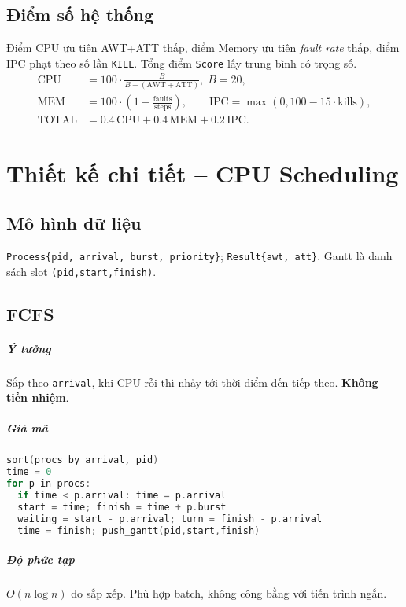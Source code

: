 \documentclass[12pt,a4paper]{report}
\begin{document}
\section{Điểm số hệ thống}
Điểm CPU ưu tiên AWT+ATT thấp, điểm Memory ưu tiên \textit{fault rate} thấp, điểm IPC phạt theo số lần \verb|KILL|. Tổng điểm \texttt{Score} lấy trung bình có trọng số.
\begin{align*}
 \text{CPU} &= 100 \cdot \frac{B}{B + (\text{AWT}+\text{ATT})},\; B=20,\\
 \text{MEM} &= 100\cdot (1-\tfrac{\text{faults}}{\text{steps}}),\qquad
 \text{IPC} = \max(0, 100 - 15\cdot \text{kills}),\\
 \text{TOTAL} &= 0.4\,\text{CPU}+0.4\,\text{MEM}+0.2\,\text{IPC}.
\end{align*}

\chapter{Thiết kế chi tiết – CPU Scheduling}
\section{Mô hình dữ liệu}
\texttt{Process\{pid, arrival, burst, priority\}}; \texttt{Result\{awt, att\}}. Gantt là danh sách slot \texttt{(pid,start,finish)}.

\section{FCFS}
\paragraph{Ý tưởng} Sắp theo \texttt{arrival}, khi CPU rỗi thì nhảy tới thời điểm đến tiếp theo. \textbf{Không tiền nhiệm}.
\paragraph{Giả mã}
\begin{lstlisting}[language=C++]
sort(procs by arrival, pid)
time = 0
for p in procs:
  if time < p.arrival: time = p.arrival
  start = time; finish = time + p.burst
  waiting = start - p.arrival; turn = finish - p.arrival
  time = finish; push_gantt(pid,start,finish)
\end{lstlisting}
\paragraph{Độ phức tạp} \(O(n\log n)\) do sắp xếp. Phù hợp batch, không công bằng với tiến trình ngắn.
\end{document}
